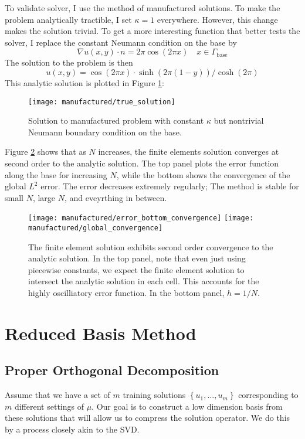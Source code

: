 \documentclass[11pt]{article}
\newcommand{\set}[1]{\left \{ #1 \right \}}
\begin{document}
To validate solver, I use the method of manufactured solutions.
To make the problem analytically tractible, I set $\kappa = 1$ everywhere.
However, this change makes the solution trivial.
To get a more interesting function that better tests the solver,
I replace the constant Neumann condition on the base by
\[ \nabla u(x,y) \cdot n = 2\pi \cos(2\pi x) \quad x \in \Gamma_{\mathrm{base}} \]
The solution to the problem is then
\[ u(x, y) = \cos(2\pi x) \cdot \sinh(2\pi (1-y)) / \cosh(2\pi) \]
This analytic solution is plotted in Figure \ref{fig:analytic}:
\begin{figure}\label{fig:analytic}
    \centering
    \texttt{[image: manufactured/true\_solution]}
    \caption{Solution to manufactured problem with constant $\kappa$ but nontrivial Neumann boundary condition on the base.}
\end{figure}

Figure \ref{fig:manufactured_convergence} shows that as $N$ increases,
the finite elements solution converges at second order to the analytic solution.
The top panel plots the error function along the base for increasing $N$,
while the bottom shows the convergence of the global $L^2$ error.
The error decreases extremely regularly; The method is stable for small $N$, large $N$, and eveyrthing in between. 
\begin{figure}\label{fig:manufactured_convergence}
    \centering
    \texttt{[image: manufactured/error\_bottom\_convergence]}
    \texttt{[image: manufactured/global\_convergence]}
    \caption{The finite element solution exhibits second order convergence to the analytic solution.
    In the top panel, note that even just using piecewise constants, we expect the finite element solution to intersect
    the analytic solution in each cell. This accounts for the highly oscilliatory error function.
    In the bottom panel, $h = 1/N$.}
\end{figure}

\section{Reduced Basis Method}
\subsection{Proper Orthogonal Decomposition}
Assume that we have a set of $m$ training solutions $\set{u_1, \ldots, u_m}$
corresponding to $m$ different settings of $\mu$.
Our goal is to construct a low dimension basis from these solutions that
will allow us to compress the solution operator.
We do this by a process closely akin to the SVD. \\
\end{document}
